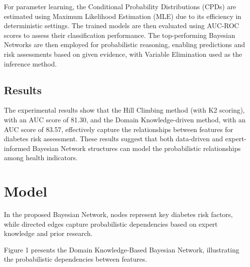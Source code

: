 \documentclass[letterpaper]{article}
\begin{document}


For parameter learning, the Conditional Probability Distributions (CPDs) are estimated using Maximum Likelihood Estimation (MLE) due to its efficiency in deterministic settings. The trained models are then evaluated using AUC-ROC scores to assess their classification performance.
The top-performing Bayesian Networks are then employed for probabilistic reasoning, enabling predictions and risk assessments based on given evidence, with Variable Elimination used as the inference method.   


\subsection{Results}

The experimental results show that the Hill Climbing method (with K2 scoring), with an AUC score of 81.30, and the Domain Knowledge-driven method, with an AUC score of 83.57, effectively capture the relationships between features for diabetes risk assessment. These results suggest that both data-driven and expert-informed Bayesian Network structures can model the probabilistic relationships among health indicators.

\section{Model}


In the proposed Bayesian Network, nodes represent key diabetes risk factors, while directed edges capture probabilistic dependencies based on expert knowledge and prior research. 

Figure 1 presents the Domain Knowledge-Based Bayesian Network, illustrating the probabilistic dependencies between features.
\end{document}
